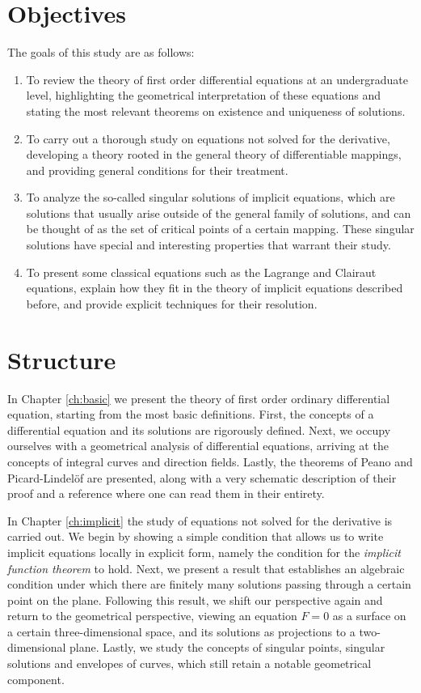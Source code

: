 \section{Objectives}

The goals of this study are as follows:

\begin{enumerate}[1.]
  \item To review the theory of first order differential equations at an undergraduate level, highlighting the geometrical interpretation of these equations and stating the most relevant theorems on existence and uniqueness of solutions.
  \item To carry out a thorough study on equations not solved for the derivative, developing a theory rooted in the general theory of differentiable mappings, and providing general conditions for their treatment.
  \item To analyze the so-called singular solutions of implicit equations, which are solutions that usually arise outside of the general family of solutions, and can be thought of as the set of critical points of a certain mapping. These singular solutions have special and interesting properties that warrant their study.
  \item To present some classical equations such as the Lagrange and Clairaut equations, explain how they fit in the theory of implicit equations described before, and provide explicit techniques for their resolution.
\end{enumerate}

\section{Structure}

In Chapter \ref{ch:basic} we present the theory of first order ordinary differential equation, starting from the most basic definitions. First, the concepts of a differential equation and its solutions are rigorously defined. Next, we occupy ourselves with a geometrical analysis of differential equations, arriving at the concepts of integral curves and direction fields. Lastly, the theorems of Peano and Picard-Lindelöf are presented, along with a very schematic description of their proof and a reference where one can read them in their entirety.

In Chapter \ref{ch:implicit} the study of equations not solved for the derivative is carried out. We begin by showing a simple condition that allows us to write implicit equations locally in explicit form, namely the condition for the \textit{implicit function theorem} to hold. Next, we present a result that establishes an algebraic condition under which there are finitely many solutions passing through a certain point on the plane. Following this result, we shift our perspective again and return to the geometrical perspective, viewing an equation $F=0$ as a surface on a certain three-dimensional space, and its solutions as projections to a two-dimensional plane. Lastly, we study the concepts of singular points, singular solutions and envelopes of curves, which still retain a notable geometrical component.

